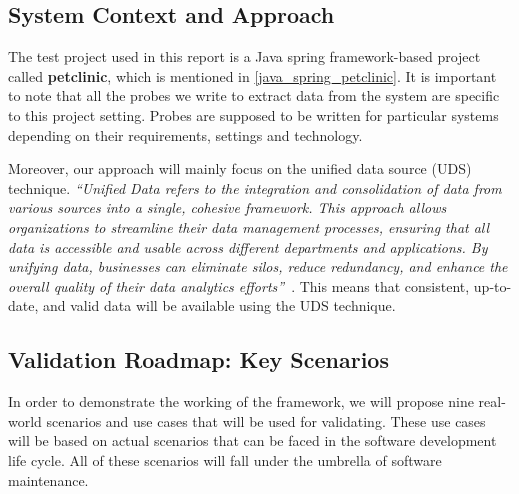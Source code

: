 \subsection{System Context and Approach}
The test project used in this report is a Java spring framework-based project called \textbf{petclinic}, which is mentioned in \autoref{java_spring_petclinic}. It is important to note that all the probes we write to extract data from the system are specific to this project setting. Probes are supposed to be written for particular systems depending on their requirements, settings and technology.

Moreover, our approach will mainly focus on the unified data source (UDS) technique. \textit{``Unified Data refers to the integration and consolidation of data from various sources into a single, cohesive framework. This approach allows organizations to streamline their data management processes, ensuring that all data is accessible and usable across different departments and applications. By unifying data, businesses can eliminate silos, reduce redundancy, and enhance the overall quality of their data analytics efforts''}~\citep{unifiedData2025}. This means that consistent, up-to-date, and valid data will be available using the UDS technique.

\subsection{Validation Roadmap: Key Scenarios}\label{ch3:validation_roadmap}

In order to demonstrate the working of the framework, we will propose nine real-world scenarios and use cases that will be used for validating. These use cases will be based on actual scenarios that can be faced in the software development life cycle. All of these scenarios will fall under the umbrella of software maintenance.

